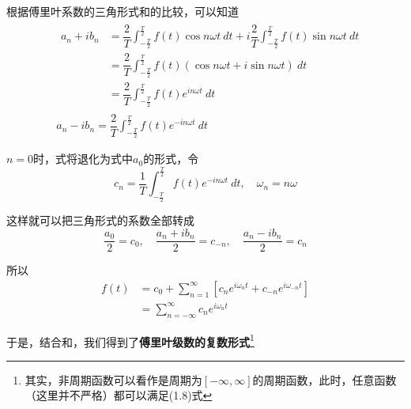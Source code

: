        根据傅里叶系数的三角形式和的比较，可以知道
        \begin{equation}
            \begin{split}
                &\begin{split}
                    a_n+ib_n&=\dfrac{2}{T}\int_{-\frac{T}{2}}^{\frac{T}{2}}f(t)\cos n\omega t\ dt+i\dfrac{2}{T}\int_{-\frac{T}{2}}^{\frac{T}{2}}f(t)\sin n\omega t\ dt\\
                    &= \dfrac{2}{T}\int_{-\frac{T}{2}}^{\frac{T}{2}}f(t)(\cos n\omega t+i\sin n\omega t)\ dt\\
                    &= \dfrac{2}{T}\int_{-\frac{T}{2}}^{\frac{T}{2}}f(t)e^{in\omega t}\ dt
                \end{split}\\
                &a_n-ib_n=\dfrac{2}{T}\int_{-\frac{T}{2}}^{\frac{T}{2}}f(t)e^{-in\omega t}\ dt
            \end{split}
            \label{eq: 1.5}
        \end{equation}

        $n=0$时，式将退化为式中$a_0$的形式，令
        \begin{equation}
            c_n=\dfrac{1}{T}\int_{-\frac{T}{2}}^{\frac{T}{2}}f(t)e^{-in\omega t}\ dt, \quad \omega_n=n\omega
            \label{eq: 1.6}
        \end{equation}

        这样就可以把三角形式的系数全部转成
        \begin{equation}
            \dfrac{a_0}{2}=c_0,\quad
            \dfrac{a_n+ib_n}{2}=c_{-n},\quad
            \dfrac{a_n-ib_n}{2}=c_{n}
            \label{eq: 1.7}
        \end{equation}

        所以
        \begin{equation}
            \begin{split}
                f(t)&= c_0+\sum\limits_{n=1}^\infty[c_n e^{i\omega_n t}+c_{-n}e^{i\omega_{-n} t}]\\
                &= \sum\limits_{n=-\infty}^{\infty}c_n e^{i\omega_n t}
            \end{split}
            \label{eq: 1.8}
        \end{equation}

        于是，结合和，我们得到了\textbf{傅里叶级数的复数形式}\footnote{其实，非周期函数可以看作是周期为$[-\infty, \infty]$的周期函数，此时，任意函数（这里并不严格）都可以满足(1.8)式}

